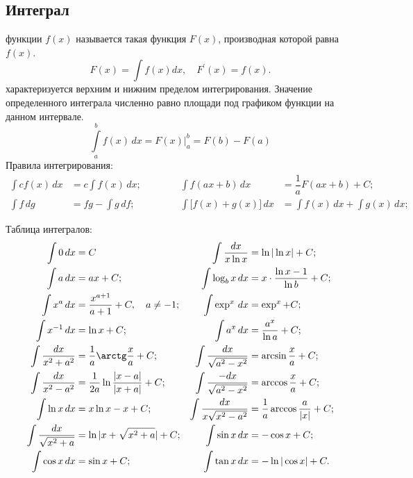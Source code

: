 \subsection{Интеграл}
 функции $f(x)$ называется такая функция $F(x)$, производная которой равна $f(x)$.
\begin{equation}
F(x) = \int f(x)dx,\quad F^\prime(x)=f(x).
\end{equation}
 характеризуется верхним и нижним пределом интегрирования. Значение определенного интеграла численно равно площади под графиком функции на данном интервале.
\begin{equation}
\int\limits^b_a f(x)\,dx = F(x) \biggr|^b_a = F(b) - F(a)
\end{equation}
Правила интегрирования:
\begin{align*}	
\int c f(x) \,dx &= c \int f(x) \,dx;  &&&&&\int f(ax + b) \,dx &= \dfrac{1}{a}F(ax + b) + C;\\
\int f \,dg &= fg - \int g \,df; &&&&& \int \bigl[f(x) + g(x)\bigr] \,dx &= \int f(x) \,dx + \int g(x) \,dx;
\end{align*}

Таблица интегралов:
\begin{align*}
\int 0 \,dx &= C & \int \dfrac{dx}{x \ln x} &= \ln |\ln x| + C; \\
\int a \,dx &= ax + C; & \int \log_b x \,dx &= x\cdot \dfrac{\ln x - 1}{\ln b} + C;\\
\int x^a \,dx &= \dfrac{x^{a+1}}{a+1} + C,\quad a \neq -1; & \int \exp^x \,dx &= \exp^x + C; \\
\int x^{-1} \,dx &= \ln x + C; & \int a^x \,dx &= \dfrac{a^x}{\ln a} + C;\\
\int \dfrac{dx}{x^2 + a^2} &= \dfrac{1}{a} \arctg \dfrac{x}{a} + C; & \int \dfrac{dx}{\sqrt{a^2 - x^2}} &= \arcsin\dfrac{x}{a} + C;\\
\int \dfrac{dx}{x^2 - a^2} &= \dfrac{1}{2a} \ln \dfrac{|x - a|}{|x + a|} + C; & \int \dfrac{-dx}{\sqrt{a^2 - x^2}} &= \arccos\dfrac{x}{a} + C;\\
\int \ln x \,dx &= x \ln x - x + C; & \int \dfrac{dx}{x \sqrt{x^2 - a^2}} &= \dfrac{1}{a}\arccos\dfrac{a}{|x|} + C;\\
\int \dfrac{dx}{\sqrt{x^2 + a}} &= \ln|x + \sqrt{x^2 + a}| + C; & \int \sin x \,dx &= -\cos x + C;\\
\int \cos x \,dx &= \sin x + C; & \int \tan x \,dx &= - \ln|\cos x| + C.
\end{align*}